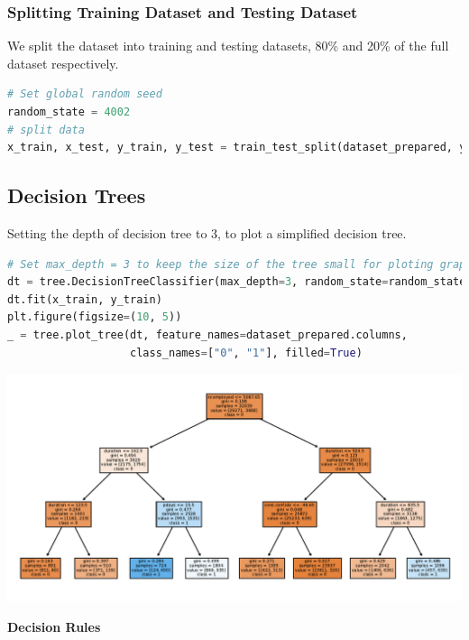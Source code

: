 \documentclass[11pt,a4paper]{article}
\begin{document}
    
    \subsubsection{Splitting Training Dataset and Testing Dataset}
    We split the dataset into training and testing datasets, 80\% and 20\% of the full dataset respectively.
\begin{lstlisting}[language = Python]
# Set global random seed
random_state = 4002
# split data
x_train, x_test, y_train, y_test = train_test_split(dataset_prepared, y, test_size=0.2, random_state=random_state)
\end{lstlisting}
    
    
    \subsection{Decision Trees} \label{decision_trees}
    Setting the depth of decision tree to 3, to plot a simplified decision tree.
\begin{lstlisting}[language = Python]
# Set max_depth = 3 to keep the size of the tree small for ploting graph
dt = tree.DecisionTreeClassifier(max_depth=3, random_state=random_state)
dt.fit(x_train, y_train)
plt.figure(figsize=(10, 5))
_ = tree.plot_tree(dt, feature_names=dataset_prepared.columns,
                   class_names=["0", "1"], filled=True)
\end{lstlisting}
    \noindent
    \begin{center}
        \includegraphics[width=.9\textwidth]{plot/classification/decision_tree.pdf}
    \end{center}
    
    \newpage
    \noindent
    \textbf{Decision Rules}

    
\end{document}
